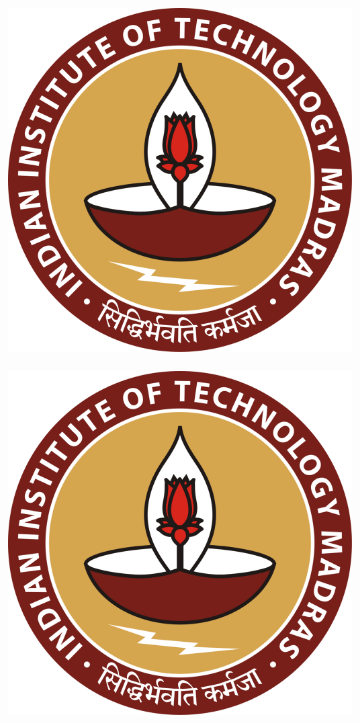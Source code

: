 \begin{figure}[htpb] %
	\begin{subfigure}{0.5\textwidth}
		\centering
		\includegraphics[width=0.9\linewidth]{iitmlogo.eps}
		\caption{}
		\label{fig:iitma}
	\end{subfigure}%
	\begin{subfigure}{0.5\textwidth}
		\centering
		\includegraphics[width=0.9\linewidth]{iitmlogo.eps}
		\caption{}
		\label{fig:iitmb}
	\end{subfigure} 	%


\end{figure}
